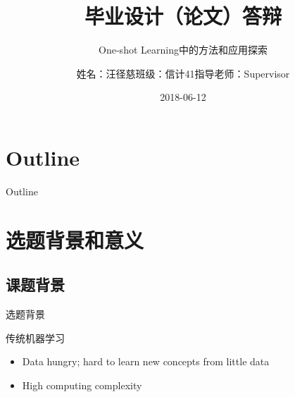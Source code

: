 \documentclass[10pt]{beamer}
\begin{document}

\title[毕业设计（论文）答辩]{\huge 毕业设计（论文）答辩}
\subtitle{\large One-shot Learning中的方法和应用探索}
\author[汪径慈]{\newline\newline 姓名：汪径慈\newline 班级：信计41\newline 指导老师：Supervisor}

\date{2018-06-12}


\begin{frame}
\maketitle
{} %
\end{frame}

\section*{Outline}
\begin{frame}{Outline}
\tableofcontents[sections={2-},hideallsubsections]
\end{frame}



\section{选题背景和意义}
\subsection{课题背景}



\begin{frame}{选题背景}
\begin{block}{传统机器学习}
\begin{itemize}
	\item Data hungry; hard to learn new concepts from little data
	\item High computing complexity
\end{itemize}
\end{block}

\end{frame}
\end{document}
